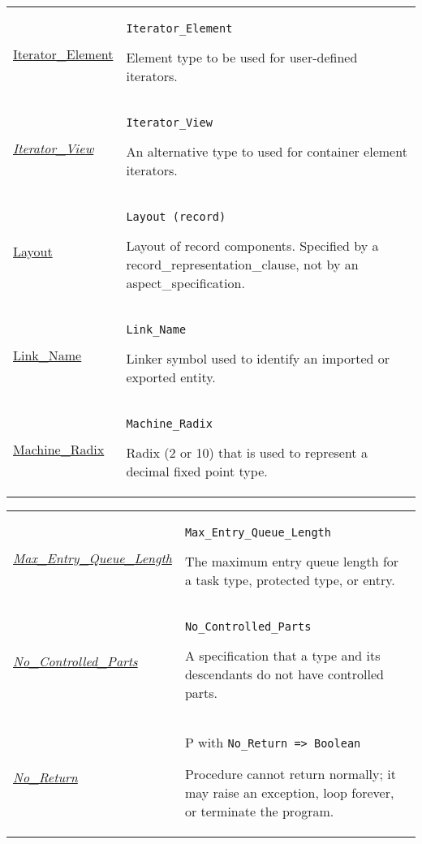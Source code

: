 \documentclass[english]{article}
\begin{document}
\begin{scriptsize}
\begin{multicols*}{3}
\begin{tabular}{@{}p{2cm}p{6.5cm}}
   \href{http://www.ada-auth.org/standards/22rm/html/RM-5-5-1.html}{Iterator\_Element} & \texttt{Iterator\_Element}

   Element type to be used for user-defined iterators.\\

   \href{http://www.ada-auth.org/standards/22rm/html/RM-5-5-1.html}{\textit{Iterator\_View}}  & \texttt{Iterator\_View}

   An alternative type to used for container element iterators.\\

   \href{http://www.ada-auth.org/standards/22rm/html/RM-13-5-1.html}{Layout} & \texttt{Layout (record)}

   Layout of record components. Specified by a record\_representation\_clause, not by an aspect\_specification.\\

   \href{http://www.ada-auth.org/standards/22rm/html/RM-B-1.html}{Link\_Name} & \texttt{Link\_Name}

   Linker symbol used to identify an imported or exported entity.\\

   \href{http://www.ada-auth.org/standards/22rm/html/RM-F-1.html}{Machine\_Radix} & \texttt{Machine\_Radix}

   Radix (2 or 10) that is used to represent a decimal fixed point type.\\

\end{tabular}
\begin{tabular}{@{}p{2cm}p{6.5cm}}

   \href{http://www.ada-auth.org/standards/22rm/html/RM-D-4.html}{\textit{Max\_Entry\_Queue\_Length}} & \texttt{Max\_Entry\_Queue\_Length}

   The maximum entry queue length for a task type, protected type, or entry.\\

   \href{http://www.ada-auth.org/standards/22rm/html/RM-H-4-1.html}{\textit{No\_Controlled\_Parts}} & \texttt{No\_Controlled\_Parts}

   A specification that a type and its descendants do not have controlled parts. \\

   \href{http://www.ada-auth.org/standards/22rm/html/RM-6-5-1.html}{\textit{No\_Return}} & P with \texttt{No\_Return => Boolean}

   Procedure cannot return normally; it may raise an exception, loop forever, or terminate the program.\\


\end{tabular}
\end{multicols*}
\end{scriptsize}
\end{document}
